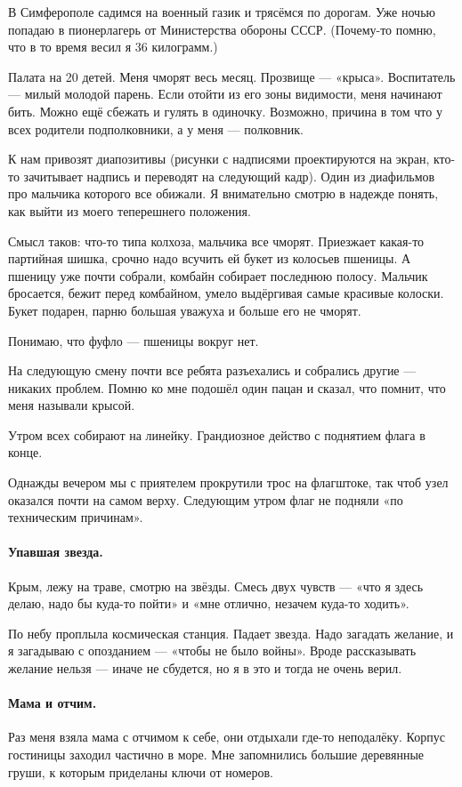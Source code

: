 \documentclass{book}
\begin{document}
В Симферополе садимся на военный газик и трясёмся по дорогам. 
Уже ночью попадаю в пионерлагерь от Министерства обороны СССР.
(Почему-то помню, что в то время весил я 36 килограмм.)

Палата на 20 детей.
Меня чморят весь месяц.
Прозвище --- «крыса».
Воспитатель --- милый молодой парень.
Если отойти из его зоны видимости, меня начинают бить.
Можно ещё сбежать и гулять в одиночку.
Возможно, причина в том что у всех родители подполковники, а у меня --- полковник.

К нам привозят диапозитивы (рисунки с надписями проектируются на экран,
кто-то зачитывает надпись и переводят на следующий кадр).
Один из диафильмов про мальчика которого все обижали.
Я внимательно смотрю в надежде понять, как выйти из моего теперешнего положения.

Смысл таков: что-то типа колхоза, 
мальчика все чморят.
Приезжает какая-то партийная шишка,
срочно надо всучить ей букет из колосьев пшеницы.
А пшеницу уже почти собрали,
комбайн собирает последнюю полосу.
Мальчик бросается, бежит перед комбайном, умело выдёргивая самые красивые колоски.
Букет подарен, парню большая уважуха и больше его не чморят.

Понимаю, что фуфло --- пшеницы вокруг нет.

На следующую смену почти все ребята разъехались и собрались другие ---
никаких проблем.
Помню ко мне подошёл один пацан и сказал, что помнит, что меня называли крысой.

Утром всех собирают на линейку.
Грандиозное действо с поднятием флага в конце.

Однажды вечером мы с приятелем прокрутили трос на флагштоке, так чтоб узел оказался почти на самом верху.
Следующим утром флаг не подняли «по техническим причинам».

\paragraph{Упавшая звезда.}
Крым, лежу на траве, смотрю на звёзды.
Смесь двух чувств --- «что я здесь делаю, надо бы куда-то пойти» и «мне отлично, незачем куда-то ходить».

По небу проплыла космическая станция.
Падает звезда. 
Надо загадать желание, и я загадываю с опозданием --- «чтобы не было войны».
Вроде рассказывать желание нельзя --- иначе не сбудется, но я в это и тогда не очень верил.

\paragraph{Мама и отчим.}
Раз меня взяла мама с отчимом к себе, они отдыхали где-то неподалёку.
Корпус гостиницы заходил частично в море.
Мне запомнились большие деревянные груши, к которым приделаны ключи от номеров.
\end{document}
